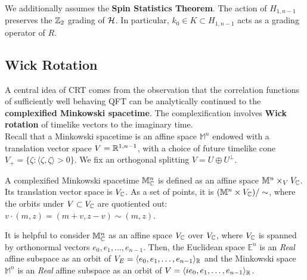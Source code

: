 \documentclass[a4paper,11pt]{article}
\begin{document}
We additionally assumes the {\bf Spin Statistics Theorem}. The action of $H_{1,n-1}$ preserves the $\mathbb{Z}_2$ grading of $\mathcal{H}$. In particular, $k_0\in K \subset H_{1,n-1}$ acts as a grading operator of $R$. 


\subsection{Wick Rotation}
A central idea of CRT comes from the observation that the correlation functions of sufficiently well behaving QFT can be analytically continued to the {\bf complexified Minkowski spacetime}. The complexification involves {\bf Wick rotation} of timelike vectors to the imaginary time. \\

Recall that a Minkowski spacetime is an affine space ${\mathbb{M}}^n$ endowed with a translation vector space $V={\mathbb{R}}^{1,n-1}$, with a choice of future timelike cone $V_+=\{\zeta: \langle \zeta,\zeta\rangle >0\}$. We fix an orthogonal splitting $V=U\oplus U^{\perp}$. 

\begin{definition}
    A complexified Minkowski spacetime ${\mathbb{M}}_{\mathbb{C}}^n$ is defined as an affine space ${\mathbb{M}^n}\times_VV_{\mathbb{C}}$.  Its translation vector space is $V_{\mathbb{C}}$. As a set of points, it is $({\mathbb{M}^n}\times V_{\mathbb{C}})/\sim$, where the orbits under $V\subset V_{\mathbb{C}}$ are quotiented out: $v\cdot(m,z) = (m+v,z-v)\sim (m,z)$. 
\end{definition}

It is helpful to consider ${\mathbb M}^n_{\mathbb{C}}$ as an affine space $V_{\mathbb{C}}$ over $V_{\mathbb{C}}$, where $V_{\mathbb{C}}$ is spanned by orthonormal vectors $e_0,e_1,\dots ,e_{n-1}$. Then, the Euclidean space $\mathbb E^n$ is an {\it Real} affine subspace as an orbit of $V_E=\langle e_0,e_1,\dots ,e_{n-1}\rangle_{\mathbb{R}}$ and the Minkowski space $\mathbb M^{n}$ is an {\it Real} affine subspace as an orbit of $V=\langle ie_0,e_1,\dots ,e_{n-1}\rangle_{\mathbb{R}}$.\\
\end{document}
